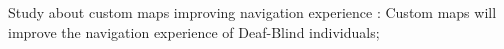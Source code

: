 Study about custom maps improving navigation experience : Custom maps will improve the navigation experience of Deaf-Blind individuals;
